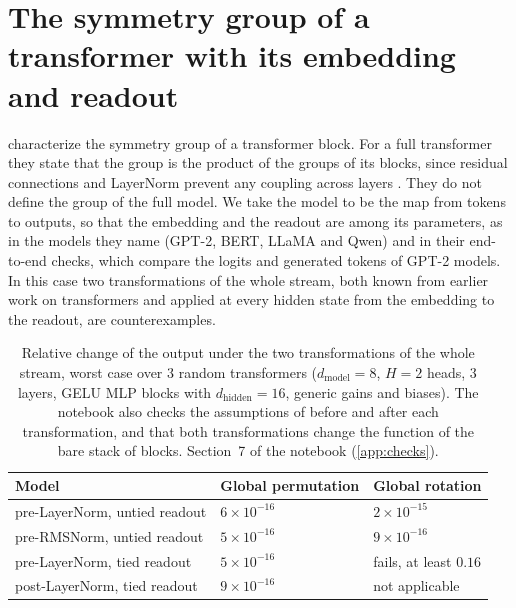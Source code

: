 \documentclass[10pt]{article}
\theoremstyle{definition}
\theoremstyle{remark}
\newcommand{\dm}{d_{\mathrm{model}}}
\newcommand{\dhid}{d_{\mathrm{hidden}}}
\begin{document}
\FloatBarrier
\section{The symmetry group of a transformer with its embedding and readout}\label{app:product}

\citet{wang2025gauge} characterize the symmetry group of a transformer block. For a full transformer they state that the group is the product of the groups of its blocks, since residual connections and LayerNorm prevent any coupling across layers \citep[Theorem~7]{wang2025gauge}. They do not define the group of the full model. We take the model to be the map from tokens to outputs, so that the embedding and the readout are among its parameters, as in the models they name (GPT-2, BERT, LLaMA and Qwen) and in their end-to-end checks, which compare the logits and generated tokens of GPT-2 models. In this case two transformations of the whole stream, both known from earlier work on transformers and applied at every hidden state from the embedding to the readout, are counterexamples.

\begin{table}[ht]
\centering\small
\caption{Relative change of the output under the two transformations of the whole stream, worst case over $3$ random transformers ($\dm = 8$, $H = 2$ heads, $3$ layers, GELU MLP blocks with $\dhid = 16$, generic gains and biases). The notebook also checks the assumptions of \citet{wang2025gauge} before and after each transformation, and that both transformations change the function of the bare stack of blocks. Section~7 of the notebook (\cref{app:checks}).}
\label{tab:product}
\begin{tabular}{lll}
\toprule
Model & Global permutation & Global rotation \\
\midrule
pre-LayerNorm, untied readout & $6\times10^{-16}$ & $2\times10^{-15}$ \\
pre-RMSNorm, untied readout & $5\times10^{-16}$ & $9\times10^{-16}$ \\
pre-LayerNorm, tied readout & $5\times10^{-16}$ & fails, at least $0.16$ \\
post-LayerNorm, tied readout & $9\times10^{-16}$ & not applicable \\
\bottomrule
\end{tabular}
\end{table}
\end{document}
